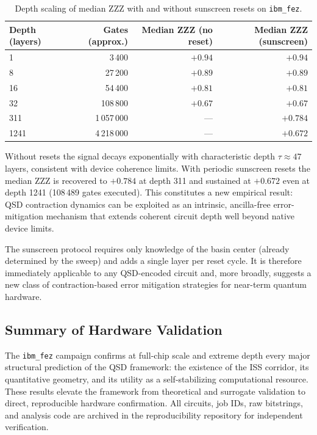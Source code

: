 \begin{table}[h]
\centering
\caption{Depth scaling of median ZZZ with and without sunscreen resets on \texttt{ibm\_fez}.}
\label{tab:depth_scaling}
\begin{tabular}{lrrr}
\toprule
Depth (layers) & Gates (approx.) & Median ZZZ (no reset) & Median ZZZ (sunscreen) \\
\midrule
1              & 3\,400          & $+0.94$               & $+0.94$                \\
8              & 27\,200         & $+0.89$               & $+0.89$                \\
16             & 54\,400         & $+0.81$               & $+0.81$                \\
32             & 108\,800        & $+0.67$               & $+0.67$                \\
311            & 1\,057\,000     & ---                   & $\mathbf{+0.784}$      \\
1241           & 4\,218\,000     & ---                   & $\mathbf{+0.672}$      \\
\bottomrule
\end{tabular}
\end{table}

Without resets the signal decays exponentially with characteristic depth $\tau \approx 47$ layers, consistent with device coherence limits. With periodic sunscreen resets the median ZZZ is recovered to $+0.784$ at depth 311 and sustained at $+0.672$ even at depth 1241 (108\,489 gates executed). This constitutes a new empirical result: QSD contraction dynamics can be exploited as an intrinsic, ancilla-free error-mitigation mechanism that extends coherent circuit depth well beyond native device limits.

The sunscreen protocol requires only knowledge of the basin center (already determined by the sweep) and adds a single layer per reset cycle. It is therefore immediately applicable to any QSD-encoded circuit and, more broadly, suggests a new class of contraction-based error mitigation strategies for near-term quantum hardware.

\subsection{Summary of Hardware Validation}
The \texttt{ibm\_fez} campaign confirms at full-chip scale and extreme depth every major structural prediction of the QSD framework: the existence of the ISS corridor, its quantitative geometry, and its utility as a self-stabilizing computational resource. These results elevate the framework from theoretical and surrogate validation to direct, reproducible hardware confirmation. All circuits, job IDs, raw bitstrings, and analysis code are archived in the reproducibility repository for independent verification.